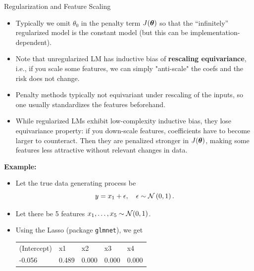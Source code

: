 \documentclass[11pt,compress,t,notes=noshow, xcolor=table]{beamer}
\begin{document}
\begin{vbframe}{Regularization and Feature Scaling}

  \begin{itemize}
    \item Typically we omit $\theta_0$ in the penalty term $J(\bm{\theta})$ so that the ``infinitely'' regularized model is the constant model (but this can be implementation-dependent).
    \item Note that unregularized LM has inductive bias of \textbf{rescaling equivariance}, i.e., if you scale some features, we can simply "anti-scale" the coefs and the risk does not change.
    \item Penalty methods typically not equivariant under rescaling of the inputs, so one usually standardizes the features beforehand.  
    \item While regularized LMs exhibit low-complexity inductive bias, they lose equivariance property: if you down-scale features, coefficients have to become larger to counteract. Then they are penalized stronger in $J(\bm{\theta})$, making some features less attractive without relevant changes in data.
      
  \end{itemize}

\framebreak

\textbf{Example:}
\begin{itemize}
\item Let the true data generating process be
$$ y = x_1 + \epsilon, \quad \epsilon \sim \mathcal{N} \left(0, 1\right).$$
\item Let there be 5 features $x_1, \ldots, x_5 \sim \mathcal{N} (0,1)$.
\item Using the Lasso (package \texttt{glmnet}), we get
\footnotesize
\vspace{0.2cm}

\begin{table}[]
\begin{tabular}{lllll}
(Intercept) & x1    & x2    & x3    & x4    \\
-0.056      & 0.489 & 0.000 & 0.000 & 0.000 
\end{tabular}
\end{table}



\end{itemize}
\end{vbframe}
\end{document}
